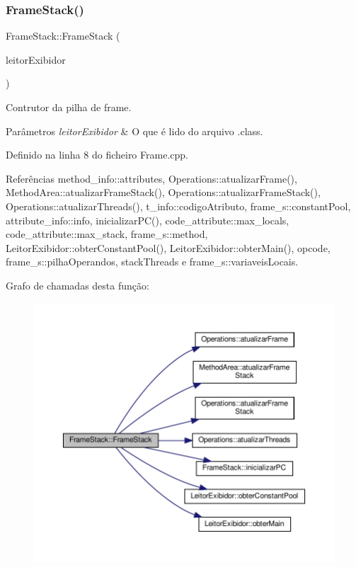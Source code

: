 \subsubsection{\texorpdfstring{Frame\+Stack()}{FrameStack()}}
{\footnotesize\ttfamily Frame\+Stack\+::\+Frame\+Stack (\begin{DoxyParamCaption}\item[{\hyperlink{classLeitorExibidor}{Leitor\+Exibidor} $\ast$}]{leitor\+Exibidor }\end{DoxyParamCaption})}



Contrutor da pilha de frame. 


\begin{DoxyParams}{Parâmetros}
{\em leitor\+Exibidor} & O que é lido do arquivo .class. \\
\hline
\end{DoxyParams}


Definido na linha 8 do ficheiro Frame.\+cpp.



Referências method\+\_\+info\+::attributes, Operations\+::atualizar\+Frame(), Method\+Area\+::atualizar\+Frame\+Stack(), Operations\+::atualizar\+Frame\+Stack(), Operations\+::atualizar\+Threads(), t\+\_\+info\+::codigo\+Atributo, frame\+\_\+s\+::constant\+Pool, attribute\+\_\+info\+::info, inicializar\+P\+C(), code\+\_\+attribute\+::max\+\_\+locals, code\+\_\+attribute\+::max\+\_\+stack, frame\+\_\+s\+::method, Leitor\+Exibidor\+::obter\+Constant\+Pool(), Leitor\+Exibidor\+::obter\+Main(), opcode, frame\+\_\+s\+::pilha\+Operandos, stack\+Threads e frame\+\_\+s\+::variaveis\+Locais.

Grafo de chamadas desta função\+:
\nopagebreak
\begin{figure}[H]
\begin{center}
\leavevmode
\includegraphics[width=350pt]{classFrameStack_a15d2d0d6497cd5d398fdc1b9862a1e3a_cgraph}
\end{center}
\end{figure}


